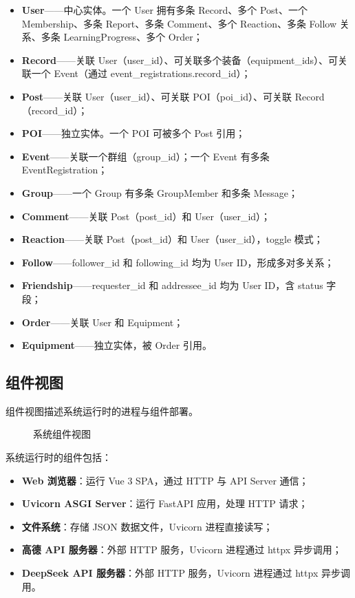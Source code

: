 \documentclass[12pt,a4paper]{ctexart}
\begin{document}
\begin{itemize}
  \item \textbf{User}——中心实体。一个 User 拥有多条 Record、多个 Post、一个 Membership、多条 Report、多条 Comment、多个 Reaction、多条 Follow 关系、多条 LearningProgress、多个 Order；
  \item \textbf{Record}——关联 User（user\_id）、可关联多个装备（equipment\_ids）、可关联一个 Event（通过 event\_registrations.record\_id）；
  \item \textbf{Post}——关联 User（user\_id）、可关联 POI（poi\_id）、可关联 Record（record\_id）；
  \item \textbf{POI}——独立实体。一个 POI 可被多个 Post 引用；
  \item \textbf{Event}——关联一个群组（group\_id）；一个 Event 有多条 EventRegistration；
  \item \textbf{Group}——一个 Group 有多条 GroupMember 和多条 Message；
  \item \textbf{Comment}——关联 Post（post\_id）和 User（user\_id）；
  \item \textbf{Reaction}——关联 Post（post\_id）和 User（user\_id），toggle 模式；
  \item \textbf{Follow}——follower\_id 和 following\_id 均为 User ID，形成多对多关系；
  \item \textbf{Friendship}——requester\_id 和 addressee\_id 均为 User ID，含 status 字段；
  \item \textbf{Order}——关联 User 和 Equipment；
  \item \textbf{Equipment}——独立实体，被 Order 引用。
\end{itemize}

\subsection{组件视图}

组件视图描述系统运行时的进程与组件部署。

\begin{figure}[H]
  \centering
  \caption{系统组件视图}
  \label{fig:component-view}
\end{figure}

系统运行时的组件包括：
\begin{itemize}
  \item \textbf{Web 浏览器}：运行 Vue 3 SPA，通过 HTTP 与 API Server 通信；
  \item \textbf{Uvicorn ASGI Server}：运行 FastAPI 应用，处理 HTTP 请求；
  \item \textbf{文件系统}：存储 JSON 数据文件，Uvicorn 进程直接读写；
  \item \textbf{高德 API 服务器}：外部 HTTP 服务，Uvicorn 进程通过 httpx 异步调用；
  \item \textbf{DeepSeek API 服务器}：外部 HTTP 服务，Uvicorn 进程通过 httpx 异步调用。
\end{itemize}
\end{document}

